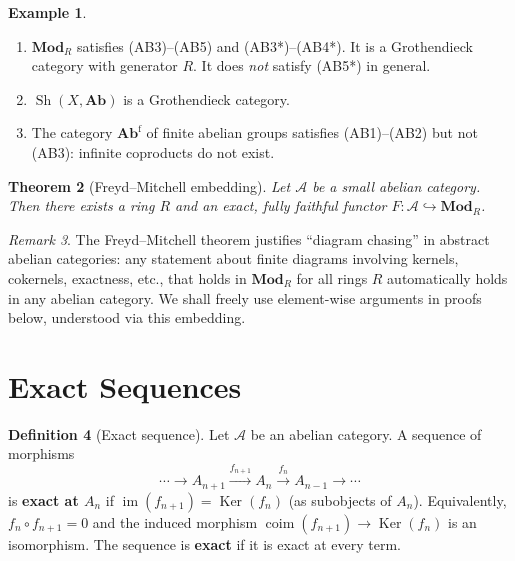 \documentclass[a4paper,12pt]{book}
\DeclareMathOperator{\im}{im}
\DeclareMathOperator{\Ker}{Ker}
\newcommand{\Ab}{\mathbf{Ab}}
\newcommand{\Mod}{\mathbf{Mod}}
\theoremstyle{definition}
\newtheorem{definition}{Definition}[section]
\newtheorem{example}[definition]{Example}
\theoremstyle{plain}
\newtheorem{theorem}[definition]{Theorem}
\theoremstyle{remark}
\newtheorem{remark}[definition]{Remark}
\begin{document}
\begin{example}\label{ex:grothendieck-cat}
\begin{enumerate}
    \item $\Mod_R$ satisfies (AB3)--(AB5) and (AB3*)--(AB4*). It is a Grothendieck category
    with generator $R$. It does \emph{not} satisfy (AB5*) in general.
    \item $\operatorname{Sh}(X, \Ab)$ is a Grothendieck category.
    \item The category $\Ab^{\mathrm{f}}$ of finite abelian groups satisfies (AB1)--(AB2)
    but not (AB3): infinite coproducts do not exist.
\end{enumerate}
\end{example}

\begin{theorem}[Freyd--Mitchell embedding]\label{thm:freyd-mitchell}
Let $\mathcal{A}$ be a small abelian category. Then there exists a ring $R$ and an
exact, fully faithful functor $F \colon \mathcal{A} \hookrightarrow \Mod_R$.
\end{theorem}

\begin{remark}\label{rem:freyd-mitchell}
The Freyd--Mitchell theorem justifies ``diagram chasing'' in abstract abelian categories:
any statement about finite diagrams involving kernels, cokernels, exactness, etc., that
holds in $\Mod_R$ for all rings $R$ automatically holds in any abelian category.
We shall freely use element-wise arguments in proofs below, understood via this embedding.
\end{remark}


\section{Exact Sequences}\label{sec:exact-seq}

\begin{definition}[Exact sequence]\label{def:exact-seq}
Let $\mathcal{A}$ be an abelian category. A sequence of morphisms
\[
    \cdots \longrightarrow A_{n+1} \xrightarrow{f_{n+1}} A_n \xrightarrow{f_n} A_{n-1}
    \longrightarrow \cdots
\]
is \textbf{exact at $A_n$} if $\im(f_{n+1}) = \Ker(f_n)$ (as subobjects of $A_n$).
Equivalently, $f_n \circ f_{n+1} = 0$ and the induced morphism
$\operatorname{coim}(f_{n+1}) \to \Ker(f_n)$ is an isomorphism.
The sequence is \textbf{exact} if it is exact at every term.
\end{definition}
\end{document}
